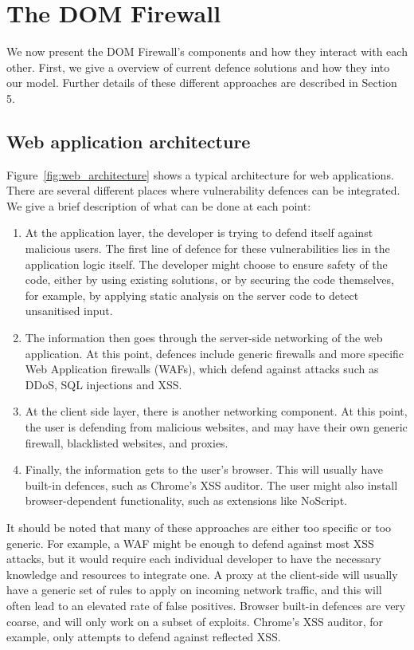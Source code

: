 \section{The DOM Firewall}

We now present the DOM Firewall's components and how they interact with each other. First, we give a overview of current defence solutions and how they into our model. Further details of these different approaches are described in Section 5.

\subsection{Web application architecture}
Figure~\ref{fig:web_architecture} shows a typical architecture for web applications. There are several different places where vulnerability defences can be integrated. We give a brief description of what can be done at each point:
\begin{enumerate}
	\item  At the application layer, the developer is trying to defend itself against malicious users. The first line of defence for these vulnerabilities lies in the application logic itself. The developer might choose to ensure safety of the code, either by using existing solutions, or by securing the code themselves, for example, by applying static analysis on the server code to detect unsanitised input.
	\item The information then goes through the server-side networking of the web application. At this point, defences include generic firewalls and more specific Web Application firewalls (WAFs), which defend against  attacks such as DDoS, SQL injections and XSS.
	\item At the client side layer, there is another networking component. At this point, the user is defending from malicious websites, and may have their own generic firewall, blacklisted websites, and proxies. 
	\item Finally, the information gets to the user's browser. This will usually have built-in defences, such as Chrome's XSS auditor. The user might also install browser-dependent functionality, such as extensions like NoScript.
\end{enumerate}

It should be noted that many of these approaches are either too specific or too generic. For example, a WAF might be enough to defend against most XSS attacks, but it would require each individual developer to have the necessary knowledge and resources to integrate one. A proxy at the client-side will usually have a generic set of rules to apply on incoming network traffic, and this will often lead to an elevated rate of false positives. Browser built-in defences are very coarse, and will only work on a subset of exploits. Chrome's XSS auditor, for example, only attempts to defend against reflected XSS. 

